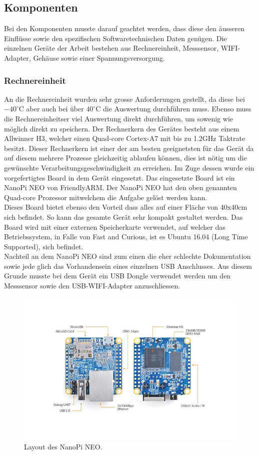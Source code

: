 \subsection{Komponenten}
Bei den Komponenten musste darauf geachtet werden, dass diese den \"ausseren Einfl\"usse sowie den spezifischen Softwaretechnischen Daten genügen. Die einzelnen Geräte der Arbeit bestehen aus Rechnereinheit, Messsensor, WIFI-Adapter, Gehäuse sowie einer Spannungsversorgung.
\subsubsection{Rechnereinheit}
An die Rechnereinheit wurden sehr grosse Anforderungen gestellt, da diese bei $-40^\circ\text{C}$ aber auch bei über $40^\circ\text{C}$ die Auswertung durchf\"uhren muss. Ebenso muss die Rechnereinheitser viel Auswertung direkt durchführen, um sowenig wie m\"oglich direkt zu speichern. Der Rechnerkern des Gerätes besteht aus einem Allwinner H3, welcher einen Quad-core Cortex-A7 mit bis zu 1.2GHz Taktrate besitzt. Dieser Rechnerkern ist einer der am besten geeignetsten für das Gerät da auf diesem mehrere Prozesse gleichzeitig ablaufen können, dies ist nötig um die gew\"unschte Verarbeitungsgeschwindigkeit zu erreichen. Im Zuge dessen wurde ein vorgefertigtes Board in dem Gerät eingesetzt. Das eingesetzte Board ist ein NanoPi NEO von FriendlyARM. Der NanoPi NEO hat den oben genannten Quad-core Prozessor mitwelchem die Aufgabe gel\"ost werden kann. \\
Dieses Board bietet ebenso den Vorteil dass alles auf einer Fl\"ache von 40x40cm sich befindet. So kann das gesamte Ger\"at sehr kompakt gestaltet werden. Das Board wird mit einer externen Speicherkarte verwendet, auf welcher das Betriebssystem, in Falle von Fast and Curious, ist es Ubuntu 16.04 (Long Time Supported), sich befindet. \\
Nachteil an dem NanoPi NEO sind zum einen die eher schlechte Dokumentation sowie jede glich das Vorhandensein eines einzelnen USB Anschlusses. Aus diesem Grunde musste bei dem Ger\"at ein USB Dongle verwendet werden um den Messsensor sowie den USB-WIFI-Adapter anzuschliessen.

\begin{figure}[H]
  \centering
  \includegraphics[height=0.6\textwidth]{Hardware/NanoPi_Neo.jpg} 
  \caption{Layout des NanoPi NEO.}
  \label{bArchitektur}
\end{figure}

